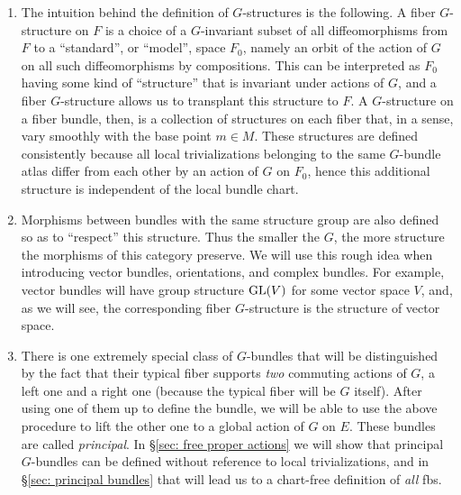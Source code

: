 \begin{rem}
    \begin{enumerate}
        \item The intuition behind the definition of $G$-structures is the following. A fiber $G$-structure on $F$ is a choice of a $G$-invariant subset of all diffeomorphisms from $F$ to a ``standard'', or ``model'', space $F_0$, namely an orbit of the action of $G$ on all such diffeomorphisms by compositions. This can be interpreted as $F_0$ having some kind of ``structure'' that is invariant under actions of $G$, and a fiber $G$-structure allows us to transplant this structure to $F$. A $G$-structure on a fiber bundle, then, is a collection of structures on each fiber that, in a sense, vary smoothly with the base point $m\in M$. These structures are defined consistently because all local trivializations belonging to the same $G$-bundle atlas differ from each other by an action of $G$ on $F_0$, hence this additional structure is independent of the local bundle chart. 
        \item Morphisms between bundles with the same structure group are also defined so as to ``respect'' this structure. Thus the smaller the $G$, the more structure the morphisms of this category preserve. We will use this rough idea when introducing vector bundles, orientations, and complex bundles. For example, vector bundles will have group structure $\operatorname{GL}(V)$ for some vector space $V$, and, as we will see, the corresponding fiber $G$-structure is the structure of vector space.
        
        \item There is one extremely special class of $G$-bundles that will be distinguished by the fact that their typical fiber supports \emph{two} commuting actions of $G$, a left one and a right one (because the typical fiber will be $G$ itself). After using one of them up to define the bundle, we will be able to use the above procedure to lift the other one to a global action of $G$ on $E$. These bundles are called \emph{principal}. In \S\ref{sec: free proper actions} we will show that principal $G$-bundles can be defined without reference to local trivializations, and in \S\ref{sec: principal bundles} that will lead us to a chart-free definition of \emph{all} \glspl{fb}.
    \end{enumerate}
\end{rem}
